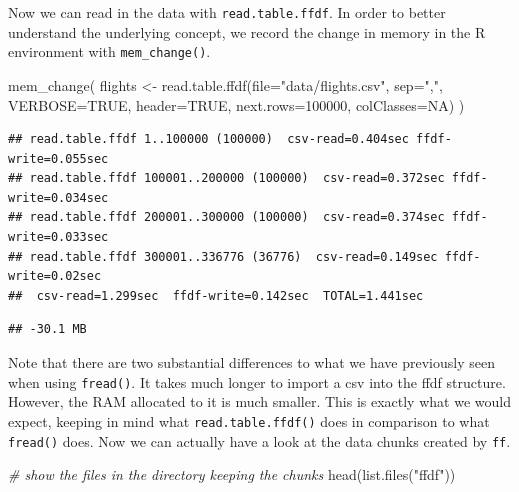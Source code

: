 \documentclass[
  12pt,
]{style/krantz}
\newenvironment{Shaded}{\begin{snugshade}}{\end{snugshade}}
\newcommand{\AttributeTok}[1]{\textcolor[rgb]{0.77,0.63,0.00}{#1}}
\newcommand{\CommentTok}[1]{\textcolor[rgb]{0.56,0.35,0.01}{\textit{#1}}}
\newcommand{\ConstantTok}[1]{\textcolor[rgb]{0.00,0.00,0.00}{#1}}
\newcommand{\DecValTok}[1]{\textcolor[rgb]{0.00,0.00,0.81}{#1}}
\newcommand{\FunctionTok}[1]{\textcolor[rgb]{0.00,0.00,0.00}{#1}}
\newcommand{\NormalTok}[1]{#1}
\newcommand{\OtherTok}[1]{\textcolor[rgb]{0.56,0.35,0.01}{#1}}
\newcommand{\StringTok}[1]{\textcolor[rgb]{0.31,0.60,0.02}{#1}}
\begin{document}
Now we can read in the data with \texttt{read.table.ffdf}. In order to better understand the underlying concept, we record the change in memory in the R environment with \texttt{mem\_change()}.

\begin{Shaded}
\begin{Highlighting}[]
\FunctionTok{mem\_change}\NormalTok{(}
\NormalTok{flights }\OtherTok{\textless{}{-}} 
     \FunctionTok{read.table.ffdf}\NormalTok{(}\AttributeTok{file=}\StringTok{"data/flights.csv"}\NormalTok{,}
                     \AttributeTok{sep=}\StringTok{","}\NormalTok{,}
                     \AttributeTok{VERBOSE=}\ConstantTok{TRUE}\NormalTok{,}
                     \AttributeTok{header=}\ConstantTok{TRUE}\NormalTok{,}
                     \AttributeTok{next.rows=}\DecValTok{100000}\NormalTok{,}
                     \AttributeTok{colClasses=}\ConstantTok{NA}\NormalTok{)}
\NormalTok{)}
\end{Highlighting}
\end{Shaded}

\begin{verbatim}
## read.table.ffdf 1..100000 (100000)  csv-read=0.404sec ffdf-write=0.055sec
## read.table.ffdf 100001..200000 (100000)  csv-read=0.372sec ffdf-write=0.034sec
## read.table.ffdf 200001..300000 (100000)  csv-read=0.374sec ffdf-write=0.033sec
## read.table.ffdf 300001..336776 (36776)  csv-read=0.149sec ffdf-write=0.02sec
##  csv-read=1.299sec  ffdf-write=0.142sec  TOTAL=1.441sec
\end{verbatim}

\begin{verbatim}
## -30.1 MB
\end{verbatim}

Note that there are two substantial differences to what we have previously seen when using \texttt{fread()}. It takes much longer to import a csv into the ffdf structure. However, the RAM allocated to it is much smaller. This is exactly what we would expect, keeping in mind what \texttt{read.table.ffdf()} does in comparison to what \texttt{fread()} does. Now we can actually have a look at the data chunks created by \texttt{ff}.

\begin{Shaded}
\begin{Highlighting}[]
\CommentTok{\# show the files in the directory keeping the chunks}
\FunctionTok{head}\NormalTok{(}\FunctionTok{list.files}\NormalTok{(}\StringTok{"ffdf"}\NormalTok{))}
\end{Highlighting}
\end{Shaded}
\end{document}
